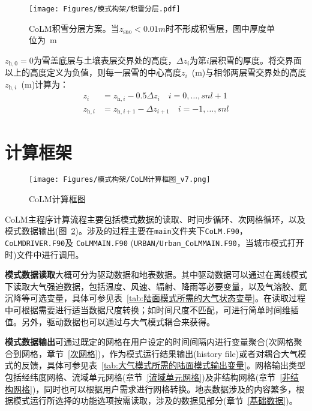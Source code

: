 {
  \begin{figure}[htbp]
    \centering
    \texttt{[image: Figures/模式构架/积雪分层.pdf]}
    \caption[CoLM积雪分层方案]{CoLM积雪分层方案。当$z_{\mathrm{sno}}<0.01 \unit{m}$时不形成积雪层，图中厚度单位为~\unit{m}}
    \label{fig:积雪分层}
  \end{figure}
}

$z_{\mathrm{h,0}}=0$为雪盖底层与土壤表层交界处的高度，$\Delta z_{i}$为第$i$层积雪的厚度。将交界面以上的高度定义为负值，则每一层雪的中心高度$z_i$~(m)与相邻两层雪交界处的高度$z_{\mathrm{h},i}$~(m)计算为：
\begin{equation}
  \begin{aligned}
    z_{i} &= z_{\mathrm{h},i}-0.5 \Delta z_{i} \quad i=0, \ldots, snl+1 \\
    z_{\mathrm{h},i} &= z_{\mathrm{h}, i+1}-\Delta z_{i+1}  \quad i=-1, \ldots, snl
  \end{aligned}
\end{equation}


\section{计算框架}\label{计算框架}

{
  \begin{figure}[htbp]
    \centering
    \texttt{[image: Figures/模式构架/CoLM计算框图\_v7.png]}
    \caption{CoLM计算框图}
    \label{fig:CoLM计算框图}
  \end{figure}
}

CoLM主程序计算流程主要包括模式数据的读取、时间步循环、次网格循环，以及模式数据输出(图~\ref{fig:CoLM计算框图})。涉及的过程主要在\texttt{main}文件夹下\texttt{CoLM.F90}，\texttt{CoLMDRIVER.F90}及 \allowbreak \texttt{CoLMMAIN.F90}
\allowbreak (\texttt{URBAN\allowbreak /Urban\allowbreak \_CoLMMAIN.F90}，当城市模式打开时)文件中进行调用。

\textbf{模式数据读取}大概可分为驱动数据和地表数据。其中驱动数据可以通过在离线模式下读取大气强迫数据，包括温度、风速、辐射、降雨等必要变量，以及气溶胶、氮沉降等可选变量，具体可参见表~\ref{tab:陆面模式所需的大气状态变量}。在读取过程中可根据需要进行适当数据尺度转换；如时间尺度不匹配，可进行简单时间维插值。另外，驱动数据也可以通过与大气模式耦合来获得。

\textbf{模式数据输出}可通过既定的网格在用户设定的时间间隔内进行变量聚合(次网格聚合到网格，章节~\ref{次网格})，作为模式运行结果输出(history file)或者对耦合大气模式的反馈，具体可参见表~\ref{tab:大气模式所需的陆面模式输出变量}。网格输出类型包括经纬度网格、流域单元网格(章节~\ref{流域单元网格})及非结构网格(章节~\ref{非结构网格})，同时也可以根据用户需求进行网格转换。地表数据涉及的内容繁多，根据模式运行所选择的功能选项按需读取，涉及的数据见部分(章节~\ref{基础数据})。

